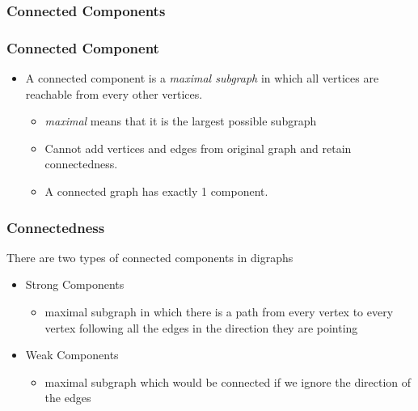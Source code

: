\documentclass[newPxFont,sthlmFooter,nooffset]{beamer}
\begin{document}
\begin{frame}[t]
  \frametitle{Connected Components}

\begin{center}
\end{center}
\end{frame}


\begin{frame}[t]
  \frametitle{Connected Component}
  \begin{itemize}
  \item A connected component is a \textit{maximal subgraph} in which all vertices are reachable from every other vertices.
    \begin{itemize}
    \item \textit{maximal} means that it is the largest possible subgraph
    \item Cannot add vertices and edges from original graph and retain
      connectedness.
  \item A connected graph has exactly 1 component. 
    \end{itemize}
  \end{itemize}
\begin{center}
\end{center}
\end{frame}
\begin{frame}[t]
  \frametitle{Connectedness}
There are two types of connected components in digraphs
\begin{itemize}
\item Strong Components
  \begin{itemize}
  \item maximal subgraph in which there is a path from every vertex to every vertex following all the edges in the direction they are pointing
  \end{itemize}
\item Weak Components
  \begin{itemize}
  \item maximal subgraph which would be connected if we ignore the direction of the edges
  \end{itemize}
\end{itemize}

\end{frame}
\end{document}
